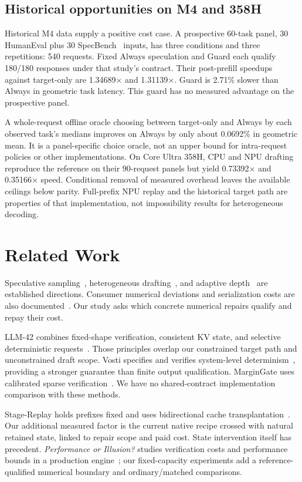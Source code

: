 \documentclass{article}
\begin{document}
\subsection{Historical opportunities on M4 and 358H}
Historical M4 data supply a positive cost case. A prospective 60-task panel, 30 HumanEval plus 30 SpecBench~\cite{specbench} inputs, has three conditions and three repetitions: 540 requests. Fixed Always speculation and Guard each qualify 180/180 responses under that study's contract. Their post-prefill speedups against target-only are 1.34689$\times$ and 1.31139$\times$. Guard is 2.71\% slower than Always in geometric task latency. This guard has no measured advantage on the prospective panel.

A whole-request offline oracle choosing between target-only and Always by each observed task's medians improves on Always by only about 0.0692\% in geometric mean. It is a panel-specific choice oracle, not an upper bound for intra-request policies or other implementations. On Core Ultra 358H, CPU and NPU drafting reproduce the reference on their 90-request panels but yield 0.73392$\times$ and 0.35166$\times$ speed. Conditional removal of measured overhead leaves the available ceilings below parity. Full-prefix NPU replay and the historical target path are properties of that implementation, not impossibility results for heterogeneous decoding.

\section{Related Work}
Speculative sampling~\cite{leviathan2023}, heterogeneous drafting~\cite{dovetail,duodecoding}, and adaptive depth~\cite{turbospec,banditspec} are established directions. Consumer numerical deviations and serialization costs are also documented~\cite{lossless}. Our study asks which concrete numerical repairs qualify and repay their cost.

LLM-42 combines fixed-shape verification, consistent KV state, and selective deterministic requests~\cite{llm42}. Those principles overlap our constrained target path and unconstrained draft scope. Vosti specifies and verifies system-level determinism~\cite{vosti}, providing a stronger guarantee than finite output qualification. MarginGate uses calibrated sparse verification~\cite{margingate}. We have no shared-contract implementation comparison with these methods.

Stage-Replay holds prefixes fixed and uses bidirectional cache transplantation~\cite{stagereplay}. Our additional measured factor is the current native recipe crossed with natural retained state, linked to repair scope and paid cost. State intervention itself has precedent. \emph{Performance or Illusion?} studies verification costs and performance bounds in a production engine~\cite{illusion}; our fixed-capacity experiments add a reference-qualified numerical boundary and ordinary/matched comparisons.
\end{document}
